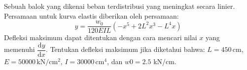 \begin{soal}
Sebuah balok yang dikenai beban terdistribusi yang meningkat secara linier.
Persamaan untuk kurva elastis diberikan oleh persamaan:
\begin{equation*}
y = \frac{w_0}{120EIL}
\left( -x^5 + 2L^2 x^3 - L^4 x \right)
\end{equation*}
Defleksi maksimum dapat ditentukan dengan cara mencari nilai $x$ yang
memenuhi $\dfrac{\mathrm{d}y}{\mathrm{d}x}$.
Tentukan defleksi maksimum jika diketahui bahwa:
$L = 450\, \mathrm{cm}$,
$E = 50000 \, \mathrm{kN}/\mathrm{cm}^2$,
$I = 30000 \, \mathrm{cm}^4$,
dan $w0 = 2.5$ kN/cm.
\end{soal}
